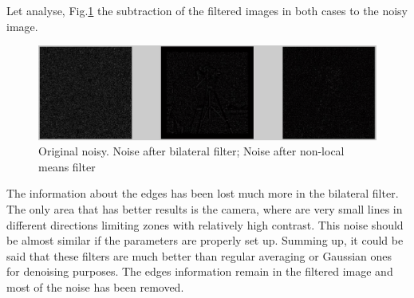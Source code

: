 \documentclass[a4paper, 10pt, conference] {article}
\begin{document}
Let analyse, Fig.\ref{noise_comp} the subtraction of the filtered images in both cases to the noisy image.
\begin{figure}[H]
	\centering
	\includegraphics[width=1\textwidth]{noise_comparison.JPG} %
	\caption{Original noisy. Noise after bilateral filter; Noise after non-local means filter}
	\label{noise_comp}
\end{figure} 
 
The information about the edges has been lost much more in the bilateral filter. The only area that has better results is the camera, where are very small lines in different directions limiting zones with relatively high contrast. This noise should be almost similar if the parameters are properly set up. Summing up, it could be said that these filters are much better than regular averaging or Gaussian ones for denoising purposes. The edges information remain in the filtered image and most of the noise has been removed.
%
%
\end{document}
